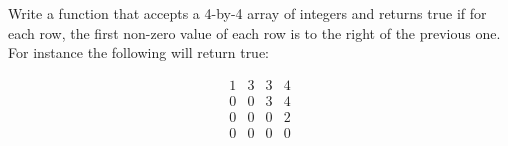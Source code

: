 \begin{ex}
Write a function that accepts a 4-by-4 array of integers and returns true if for each row, the first non-zero value of each row is to the right of the previous one. For instance the following will return true:

\begin{align*}
1 & 3 & 3 & 4 \\
0 & 0 & 3 & 4 \\
0 & 0 & 0 & 2 \\
0 & 0 & 0 & 0 \\
\end{align*}
\end{ex}
